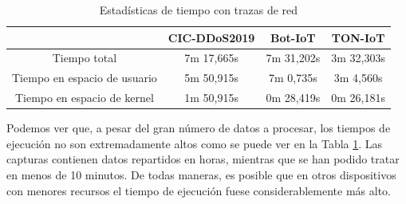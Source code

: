 \begin{table}[H]
    \begin{center}
        \begin{tabular}{|c | c c c |} 
            \hline
            & \textbf{CIC-DDoS2019} & \textbf{Bot-IoT} & \textbf{TON-IoT} \\
            \hline
            Tiempo total                 & 7m 17,665s & 7m 31,202s & 3m 32,303s \\
            Tiempo en espacio de usuario & 5m 50,915s & 7m  0,735s & 3m  4,560s \\
            Tiempo en espacio de kernel  & 1m 50,915s & 0m 28,419s & 0m 26,181s \\
            \hline
        \end{tabular}
    \end{center}
    \caption{Estadísticas de tiempo con trazas de red}
    \label{table:statstimeoffline}
\end{table}

Podemos ver que, a pesar del gran número de datos a procesar, los tiempos de ejecución no son extremadamente altos como se puede ver en la Tabla \ref{table:statstimeoffline}. Las capturas contienen datos repartidos en horas, mientras que se han podido tratar en menos de 10 minutos. De todas maneras, es posible que en otros dispositivos con menores recursos el tiempo de ejecución fuese considerablemente más alto.

\begin{table}[H]
    \begin{center}
    \end{center}
    \caption{Archivos generados con trazas de red}
    \label{table:generatedfilesoffline}
\end{table}

